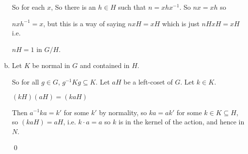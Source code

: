 \documentclass[11pt,oneside]{article}
\numberwithin{equation}{section}
\theoremstyle{definition}
\begin{document}
\begin{solution}
\begin{enumerate}[(a)]
    So for each $x$, So there is an $h \in H$ such that $ n = x h x ^ {-1}$.  So $nx = xh$ so

    $nxh^{-1}  = x $, but this is a way of saying $n x H = xH$ which is just $nH xH = xH$ i.e.

    $nH = 1$ in $G/H$.

    
  \item

    Let $K$ be normal in $G$ and contained in $H$.

    So for all $g \in G$, $g^{-1} K g \subseteq K$.  Let $aH$ be a left-coset of $G$.  Let $k \in K$.

    $(kH)(aH) = (kaH)$

    Then $ a^{-1}ka = k'$ for some $k'$ by normality, so $ka = ak'$ for some $k \in K \subseteq H$, so
    $(kaH) = aH$, i.e. $k \cdot  a = a$ so $ k $ is in the kernel of the action, and hence in $N$.

    \qed    

  \end{enumerate}
    
\end{solution}
\end{document}

